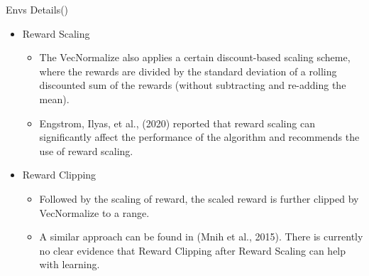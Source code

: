\documentclass[english, xcolor=dvipsnames, aspectratio=169]{beamer}
\begin{document}
\begin{frame}{Envs Details(\citet{blog})}
\begin{itemize}
        \item Reward Scaling
        \begin{itemize}
            \item The VecNormalize also applies a certain discount-based scaling scheme, where the rewards are divided by the standard deviation of a rolling discounted sum of the rewards (without subtracting and re-adding the mean).
            \item Engstrom, Ilyas, et al., (2020) reported that reward scaling can significantly affect the performance of the algorithm and recommends the use of reward scaling.
        \end{itemize}
        
        \item Reward Clipping 
        \begin{itemize}
            \item Followed by the scaling of reward, the scaled reward is further clipped by VecNormalize to a range.
\item A similar approach can be found in (Mnih et al., 2015). There is currently no clear evidence that Reward Clipping after Reward Scaling can help with learning.
        \end{itemize}
\end{itemize}

\end{frame}



% 
    
\end{document}
